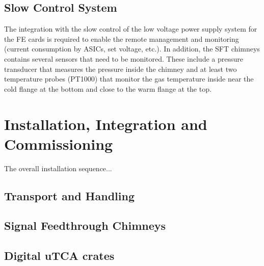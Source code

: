 
\subsection{Slow Control System}
\label{sec:fddp-tpc-elec-intfc-sc}

The integration with the slow control of the low voltage power supply system for the FE cards is required to enable the remote management and monitoring (current consumption by ASICs, set voltage, etc.).
In addition, the SFT chimneys contains several sensors that need to be monitored. These include a pressure transducer that measures the pressure inside the chimney and at least two temperature probes (PT1000) that monitor the gas temperature inside near the cold flange at the bottom and close to the warm flange at the top.  


\section{Installation, Integration and Commissioning}
\label{sec:fddp-tpc-elec-install}

The overall installation sequence...

\subsection{Transport and Handling}
\label{sec:fddp-tpc-elec-install-transport}

\subsection{Signal Feedthrough Chimneys}
\label{sec:fddp-tpc-elec-install-sft}

\subsection{Digital uTCA crates}
\label{sec:fddp-tpc-elec-install-utca}



